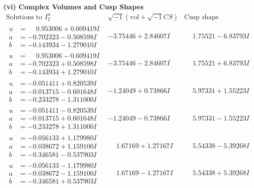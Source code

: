\documentclass[1p]{elsarticle_modified}
\theoremstyle{definition}
\newcommand{\I}{\sqrt{-1}}
\begin{document}
\newpage\flushleft \textbf{(vi) Complex Volumes and Cusp Shapes}
$$\begin{array}{c|c|c}  
\text{Solutions to }I^u_{2}& \I (\text{vol} + \sqrt{-1}CS) & \text{Cusp shape}\\
 \hline 
\begin{aligned}
u &= \phantom{-}0.953006 + 0.609419 I \\
a &= -0.702323 - 0.508598 I \\
b &= -0.143934 - 1.279010 I\end{aligned}
 & -3.75446 + 2.84607 I & \phantom{-}1.75521 - 6.83793 I \\ \hline\begin{aligned}
u &= \phantom{-}0.953006 - 0.609419 I \\
a &= -0.702323 + 0.508598 I \\
b &= -0.143934 + 1.279010 I\end{aligned}
 & -3.75446 - 2.84607 I & \phantom{-}1.75521 + 6.83793 I \\ \hline\begin{aligned}
u &= -0.051411 + 0.820539 I \\
a &= -0.013715 - 0.601648 I \\
b &= -0.233278 - 1.311000 I\end{aligned}
 & -1.24049 + 0.73866 I & \phantom{-}5.97331 + 1.55223 I \\ \hline\begin{aligned}
u &= -0.051411 - 0.820539 I \\
a &= -0.013715 + 0.601648 I \\
b &= -0.233278 + 1.311000 I\end{aligned}
 & -1.24049 - 0.73866 I & \phantom{-}5.97331 - 1.55223 I \\ \hline\begin{aligned}
u &= -0.056133 + 1.179980 I \\
a &= -0.038672 + 1.159100 I \\
b &= -0.346581 - 0.537903 I\end{aligned}
 & \phantom{-}1.67169 + 1.27167 I & \phantom{-}5.54338 - 5.39268 I \\ \hline\begin{aligned}
u &= -0.056133 - 1.179980 I \\
a &= -0.038672 - 1.159100 I \\
b &= -0.346581 + 0.537903 I\end{aligned}
 & \phantom{-}1.67169 - 1.27167 I & \phantom{-}5.54338 + 5.39268 I \\ \hline\begin{aligned}

\end{aligned}
\end{array}$$
\end{document}
